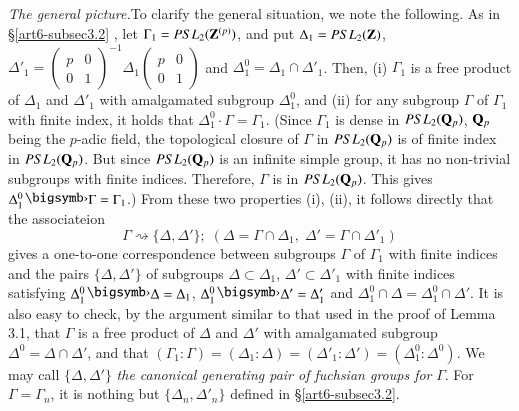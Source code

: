 \subsection{}\label{art6-subsec3.5}
\textit{The general picture.}\pageoriginale  To clarify the general situation, we note the following. As in \S \eqref{art6-subsec3.2} , let $\Gamma_1 = PSL_2 (\mathbf{Z}^{(p)})$, and put $\Delta_1 = PSL_2 (\mathbf{Z})$, $\Delta'_1 = \begin{pmatrix}
p &0\\
0&1
\end{pmatrix}^{-1} \Delta_1 
\begin{pmatrix}
p&0\\
0&1
\end{pmatrix}$ and $\Delta^0_1 = \Delta_1 \cap \Delta'_1$. Then, (i) $\Gamma_1$ is a free product of $\Delta_1$ and $\Delta'_1$ with amalgamated subgroup $\Delta^0_1$, and (ii) for any subgroup $\Gamma$ of $\Gamma_1$ with finite index, it holds that $\Delta^0_1  \cdot \Gamma = \Gamma_1$. (Since $\Gamma_1$ is dense in $PSL_2 (\mathbf{Q}_p)$, $\mathbf{Q}_p$  being the $p$-adic field, the topological closure of $\Gamma$ in $PSL_2 (\mathbf{Q}_p)$ is of finite index in $PSL_2 (\mathbf{Q}_p)$. But since $PSL_2(\mathbf{Q}_p)$ is an infinite simple group, it has no non-trivial subgroups with finite indices. Therefore, $\Gamma$ is  in $PSL_2 (\mathbf{Q}_p)$. This gives $\Delta^0_1 \bigdot \Gamma = \Gamma_1$.) From these two properties (i), (ii), it follows directly that the associateion
\setcounter{equation}{0}
\begin{equation}
\Gamma \rightsquigarrow \{\Delta, \Delta'\} ; \; (\Delta = \Gamma \cap \Delta_1, \; \Delta' = \Gamma \cap \Delta'_1) 
\label{art6-eq3.5.1}
\end{equation}
gives a one-to-one correspondence between subgroups $\Gamma$ of $\Gamma_1$ with finite indices and the pairs $\{\Delta, \Delta'\}$ of subgroups $\Delta \subset \Delta_1$, \; $\Delta' \subset \Delta'_1$ with finite indices satisfying $\Delta^0_1 \bigdot \Delta = \Delta_1$, $\Delta^0_1 \bigdot \Delta' = \Delta'_1$ and $\Delta^0_1 \cap \Delta = \Delta^0_1 \cap \Delta'$. It is also easy to check, by the argument similar to that used in the proof of Lemma 3.1, that $\Gamma$ is a free product of $\Delta$ and $\Delta'$ with amalgamated subgroup $\Delta^0 = \Delta \cap \Delta'$, and that $(\Gamma_1 : \Gamma) =(\Delta_1 : \Delta) = (\Delta'_1: \Delta') = (\Delta^0_1: \Delta^0)$. We may call $\{\Delta, \Delta'\}$ \textit{the canonical generating pair of fuchsian groups for} $\Gamma$. For $\Gamma = \Gamma_n$, it is nothing but $\{\Delta_n, \Delta'_n\}$ defined in \S \ref{art6-subsec3.2}.


